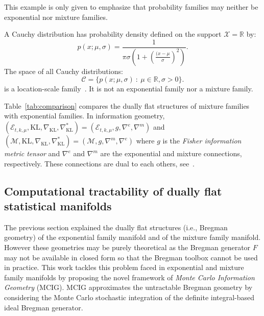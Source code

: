 \documentclass[graybox]{svmult}
\def\calC{\mathcal{C}}
\def\KL{\mathrm{KL}}
\def\bbR{\mathbb{R}}
\def\calE{\mathcal{E}}
\def\calX{\mathcal{X}}
\def\calM{\mathcal{M}}
\def\st{{\ :\ }}
\begin{document}
This example is only given  to emphasize that probability families may neither be exponential nor mixture families.
	
	A Cauchy distribution has probability density  defined on the support $\calX=\bbR$ by:
	\begin{equation} 
p(x;\mu,\sigma) = \frac{1}{\pi \sigma \left(1+\left(\frac{(x-\mu}{\sigma}\right)^2\right)} .
\end{equation}
	The space of all Cauchy distributions:
	\begin{equation}
	\calC=\{p(x;\mu,\sigma) \st \mu\in\bbR, \sigma>0\}.
		\end{equation}
	is a location-scale family~\cite{KassVos-1997}. It is not an exponential family nor a mixture family.
	
	
 

	Table~\ref{tab:comparison} compares the dually flat structures of mixture families with exponential families.
	In information geometry, $(\calE_{t,k,\mu},\KL,\nabla_\KL,\nabla_\KL^*)=(\calE_{t,k,\mu},g,\nabla^e,\nabla^m)$ and 
	$(\calM,\KL,\nabla_\KL,\nabla_\KL^*)=(\calM,g,\nabla^m,\nabla^e)$
	where $g$ is the {\em Fisher information metric tensor} and $\nabla^e$ and $\nabla^m$ are the exponential and mixture connections, respectively.
	These connections are dual to each others, see~\cite{IG-2014}.
	
	


\subsection{Computational tractability of dually flat statistical manifolds}\label{sec:comptract}

The previous section explained the dually flat structures (i.e., Bregman geometry) of the exponential family manifold and of the mixture family manifold.
However these geometries may be purely theoretical as the Bregman generator $F$ may not be available in closed form so that the Bregman toolbox cannot be used in practice.
This work tackles this problem faced in exponential and mixture family manifolds by proposing the novel framework of
 {\em Monte Carlo Information Geometry} (MCIG).
MCIG approximates the untractable Bregman geometry by considering the Monte Carlo stochastic integration of the definite integral-based ideal Bregman generator.
\end{document}

